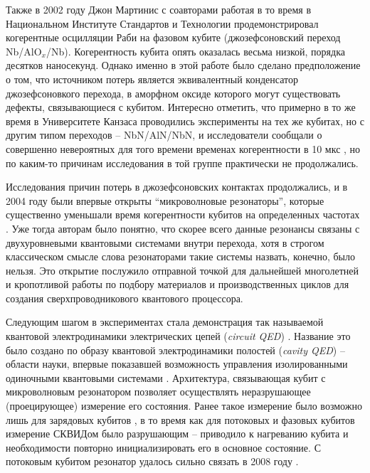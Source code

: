 \documentclass[14pt, a4paper]{extreport}
\numberwithin{equation}{section}
\begin{document}
Также в 2002 году Джон Мартинис с соавторами работая в то время в Национальном Институте Стандартов и Технологии продемонстрировал когерентные осцилляции Раби на фазовом кубите \cite{martinis2002rabi} (джозефсоновский переход Nb/AlO$_x$/Nb). Когерентность кубита опять оказалась весьма низкой, порядка десятков наносекунд. Однако именно в этой работе было сделано предположение о том, что источником потерь является эквивалентный конденсатор джозефсоновкого перехода, в аморфном оксиде которого могут существовать дефекты, связывающиеся с кубитом. Интересно отметить, что примерно в то же время в Университете Канзаса проводились эксперименты на тех же кубитах, но с другим типом переходов -- NbN/AlN/NbN, и исследователи сообщали о совершенно невероятных для того времени временах когерентности в 10 мкс \cite{han2001time}, но по каким-то причинам исследования в той группе практически не продолжались.

Исследования причин потерь в джозефсоновских контактах продолжались, и в 2004 году были впервые открыты ``микроволновые резонаторы'', которые существенно уменьшали время когерентности кубитов на определенных частотах \cite{simmonds2004decoherence}. Уже тогда авторам было понятно, что скорее всего данные резонансы связаны с двухуровневыми квантовыми системами внутри перехода, хотя в строгом классическом смысле слова резонаторами такие системы назвать, конечно, было нельзя. Это открытие послужило отправной точкой для дальнейшей многолетней и кропотливой работы по подбору материалов и производственных циклов для создания сверхпроводникового квантового процессора.

Следующим шагом в экспериментах стала демонстрация так называемой квантовой электродинамики электрических цепей (\textit{circuit QED}) \cite{blais2004cavity, wallraff2004strong}. Название это было создано по образу квантовой электродинамики полостей (\textit{cavity QED}) -- области науки, впервые показавшей возможность управления изолированными одиночными квантовыми системами \cite{mabuchi2002cavity}. Архитектура, связывающая кубит с микроволновым резонатором позволяет осуществлять неразрушающее (проецирующее) измерение его состояния. Ранее такое измерение было возможно лишь для зарядовых кубитов \cite{lehnert2003measurement}, в то время как для потоковых и фазовых кубитов измерение СКВИДом было разрушающим -- приводило к нагреванию кубита и необходимости повторно инициализировать его в основное состояние. С потоковым кубитом резонатор удалось сильно связать в 2008 году \cite{abdumalikov2008vacuum}.
\end{document}

